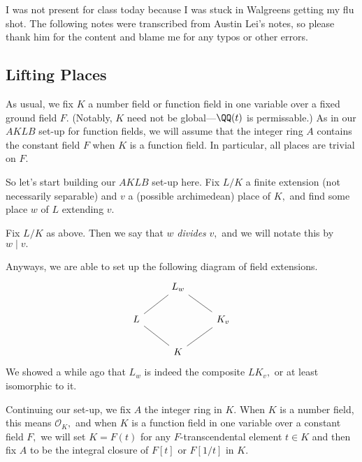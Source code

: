 \documentclass[../notes.tex]{subfiles}
\begin{document}














I was not present for class today because I was stuck in Walgreens getting my flu shot. The following notes were transcribed from Austin Lei's notes, so please thank him for the content and blame me for any typos or other errors.

\subsection{Lifting Places}
As usual, we fix $K$ a number field or function field in one variable over a fixed ground field $F.$ (Notably, $K$ need not be global---$\QQ(t)$ is permissable.) As in our $AKLB$ set-up for function fields, we will assume that the integer ring $A$ contains the constant field $F$ when $K$ is a function field. In particular, all places are trivial on $F.$

So let's start building our $AKLB$ set-up here. Fix $L/K$ a finite extension (not necessarily separable) and $v$ a (possible archimedean) place of $K,$ and find some place $w$ of $L$ extending $v.$
\begin{defi}
	Fix $L/K$ as above. Then we say that $w$ \textit{divides} $v,$ and we will notate this by $w\mid v.$
\end{defi}
Anyways, we are able to set up the following diagram of field extensions.
\[\begin{tikzcd}
	& {L_w} \\
	L && {K_v} \\
	& K
	\arrow[no head, from=1-2, to=2-1]
	\arrow[no head, from=2-1, to=3-2]
	\arrow[no head, from=1-2, to=2-3]
	\arrow[no head, from=2-3, to=3-2]
\end{tikzcd}\]
We showed a while ago that $L_w$ is indeed the composite $LK_v,$ or at least isomorphic to it.

Continuing our set-up, we fix $A$ the integer ring in $K.$ When $K$ is a number field, this means $\mathcal O_K,$ and when $K$ is a function field in one variable over a constant field $F,$ we will set $K=F(t)$ for any $F$-transcendental element $t\in K$ and then fix $A$ to be the integral closure of $F[t]$ or $F[1/t]$ in $K.$
\end{document}
